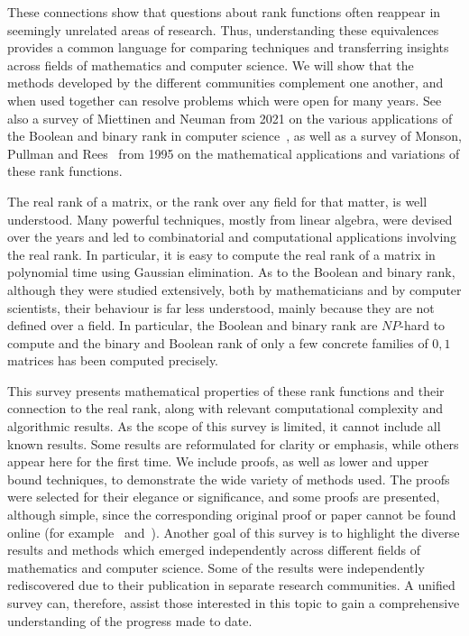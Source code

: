 \documentclass[11pt]{article}
\begin{document}
These connections show that questions about rank functions often reappear in seemingly unrelated areas of research.
Thus, understanding these equivalences provides a common language for comparing techniques and transferring insights across fields of mathematics and computer science.
We will show that the methods developed by the different communities complement one another, and when used together can resolve problems which were open for many years.
See also a survey of Miettinen and Neuman from 2021 on the various applications of the Boolean and binary rank in computer science~\cite{miettinen2021recent},
as well as a survey of Monson, Pullman and Rees~\cite{Monson} from 1995 on the mathematical applications and variations of these rank functions.

The real rank of a matrix, or the rank over any field for that matter, is well understood.
Many powerful techniques, mostly from linear algebra, were devised over the years and led to combinatorial and computational applications involving the real rank.
In particular, it is easy to compute the real rank of a matrix in polynomial time using Gaussian elimination.
As to the Boolean and binary rank, although they were studied extensively, both by mathematicians and by computer scientists,
their behaviour is far less understood, mainly because they are not defined over a field.
In particular, the Boolean and binary rank are $NP$-hard to compute and the binary and Boolean rank of only a few concrete families of $0,1$ matrices has been computed precisely.

This survey presents mathematical properties of these rank functions and their connection to the real rank,
along with relevant computational complexity and algorithmic results.
As the scope of this survey is limited, it cannot include all known results.
Some results are reformulated for clarity or emphasis, while others appear here for the first time.
We include proofs, as well as lower and upper bound techniques, to demonstrate the wide variety of methods used.
The proofs were selected for their elegance or significance, and some proofs are presented, although simple,
since the corresponding original proof or paper cannot be found online (for example~\cite{ Monson} and~\cite{Caen2}).
Another goal of this survey is to highlight the diverse results and methods which emerged independently across different fields of  mathematics and computer science.
Some of the results were independently rediscovered due to their publication in separate research communities.
A unified survey can, therefore, assist those interested in this topic to gain a comprehensive understanding of the progress made to date.
\end{document}
